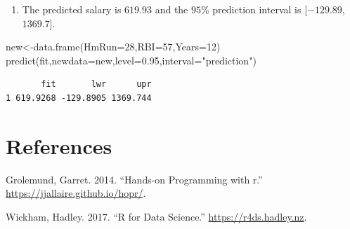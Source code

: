 \documentclass[
  letterpaper,
  DIV=11,
  numbers=noendperiod]{scrreprt}
\newenvironment{Shaded}{\begin{snugshade}}{\end{snugshade}}
\newcommand{\AttributeTok}[1]{\textcolor[rgb]{0.40,0.45,0.13}{#1}}
\newcommand{\DecValTok}[1]{\textcolor[rgb]{0.68,0.00,0.00}{#1}}
\newcommand{\FloatTok}[1]{\textcolor[rgb]{0.68,0.00,0.00}{#1}}
\newcommand{\FunctionTok}[1]{\textcolor[rgb]{0.28,0.35,0.67}{#1}}
\newcommand{\NormalTok}[1]{\textcolor[rgb]{0.00,0.23,0.31}{#1}}
\newcommand{\OtherTok}[1]{\textcolor[rgb]{0.00,0.23,0.31}{#1}}
\newcommand{\StringTok}[1]{\textcolor[rgb]{0.13,0.47,0.30}{#1}}
\providecommand{\tightlist}{%
  \setlength{\itemsep}{0pt}\setlength{\parskip}{0pt}}\usepackage{longtable,booktabs,array}
\newlength{\cslhangindent}
\newlength{\cslentryspacingunit} %
\newenvironment{CSLReferences}[2] %
 {%
  \setlength{\parindent}{0pt}
  \ifodd #1
  \let\oldpar\par
  \def\par{\hangindent=\cslhangindent\oldpar}
  \fi
  \setlength{\parskip}{#2\cslentryspacingunit}
 }%
 {}
\begin{document}
\begin{blackbox}

\begin{enumerate}
\def\labelenumi{\arabic{enumi}.}
\setcounter{enumi}{1}
\tightlist
\item
  The predicted salary is \(619.93\) and the \(95\)\% prediction
  interval is {[}\(-129.89\),\(1369.7\){]}.
\end{enumerate}

\end{blackbox}

\begin{Shaded}
\begin{Highlighting}[numbers=left,,]
\NormalTok{new}\OtherTok{\textless{}{-}}\FunctionTok{data.frame}\NormalTok{(}\AttributeTok{HmRun=}\DecValTok{28}\NormalTok{,}\AttributeTok{RBI=}\DecValTok{57}\NormalTok{,}\AttributeTok{Years=}\DecValTok{12}\NormalTok{)}
\FunctionTok{predict}\NormalTok{(fit,}\AttributeTok{newdata=}\NormalTok{new,}\AttributeTok{level=}\FloatTok{0.95}\NormalTok{,}\AttributeTok{interval=}\StringTok{"prediction"}\NormalTok{)}
\end{Highlighting}
\end{Shaded}

\begin{verbatim}
       fit       lwr      upr
1 619.9268 -129.8905 1369.744
\end{verbatim}


\hypertarget{references}{%
\chapter*{References}\label{references}}


\hypertarget{refs}{}
\begin{CSLReferences}{1}{0}
\leavevmode{}%
Grolemund, Garret. 2014. {``Hands-on Programming with r.''}
\url{https://jjallaire.github.io/hopr/}.

\leavevmode{}%
Wickham, Hadley. 2017. {``R for Data Science.''}
\url{https://r4ds.hadley.nz}.

\end{CSLReferences}



\printindex
\end{document}
